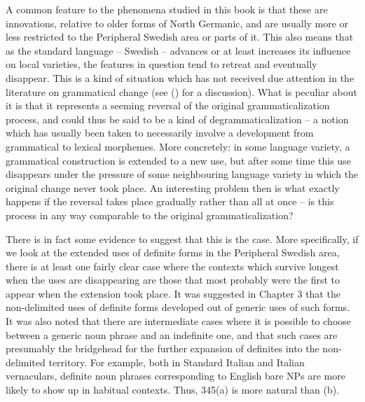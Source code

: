 \begin{styleBodytextC}
A common feature to the phenomena studied in this book is that these are innovations, relative to older forms of North Germanic, and are usually more or less restricted to the Peripheral Swedish area or parts of it. This also means that as the standard language – Swedish – advances or at least increases its influence on local varieties, the features in question tend to retreat and eventually disappear. This is a kind of situation which has not received due attention in the literature on grammatical change (see (\citet{Dahl2004}) for a discussion). What is peculiar about it is that it represents a seeming reversal of the original grammaticalization process, and could thus be said to be a kind of degrammaticalization – a notion which has usually been taken to necessarily involve a development from grammatical to lexical morphemes. More concretely: in some language variety, a grammatical construction is extended to a new use, but after some time this use disappears under the pressure of some neighbouring language variety in which the original change never took place. An interesting problem then is what exactly happens if the reversal takes place gradually rather than all at once – is this process in any way comparable to the original grammaticalization?

\end{styleBodytextC}

\begin{styleBodytextC}
There is in fact some evidence to suggest that this is the case. More specifically, if we look at the extended uses of definite forms in the Peripheral Swedish area, there is at least one fairly clear case where the contexts which survive longest when the uses are disappearing are those that most probably were the first to appear when the extension took place. It was suggested in Chapter 3 that the non-delimited uses of definite forms developed out of generic uses of such forms. It was also noted that there are intermediate cases where it is possible to choose between a generic noun phrase and an indefinite one, and that such cases are presumably the bridgehead for the further expansion of definites into the non-delimited territory. For example, both in Standard Italian and Italian vernaculars, definite noun phrases corresponding to English bare NPs are more likely to show up in habitual contexts. Thus, 345(a) is more natural than (b).

\end{styleBodytextC}

